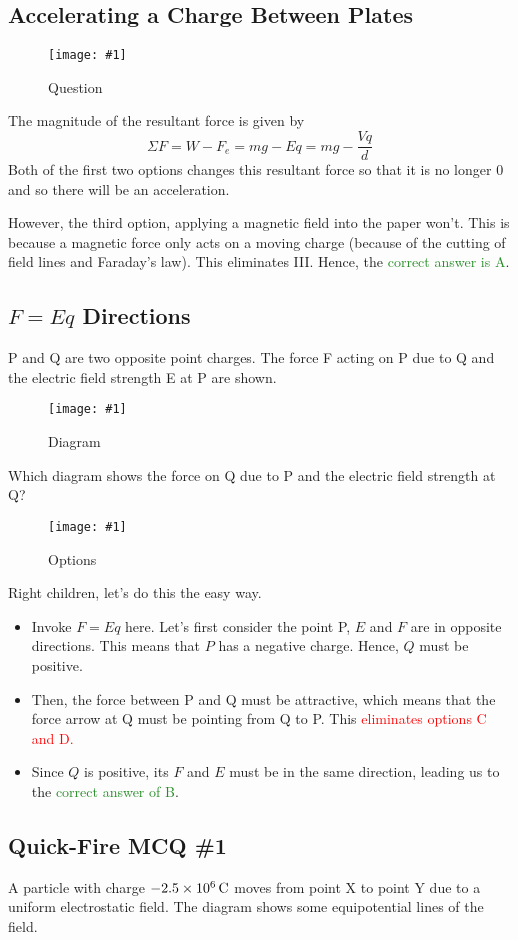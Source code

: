 \documentclass[a4paper,12pt]{article}
\newcommand{\img}[4]{\begin{center}
  \begin{figure}[H]
    \centering
    \texttt{[image: \#1]}
    \caption{#3}
    \label{fig:#4}
  \end{figure}
\end{center}}
\begin{document}
\pagebreak

\subsection{Accelerating a Charge Between Plates}

\img{ex/5.png}{0.9}{Question}{ex5}

The magnitude of the resultant force is given by
$$\Sigma F = W - F_e = mg - Eq = mg - \frac{Vq}{d}$$
Both of the first two options changes this resultant force so that it is no longer 0 and so there will be an acceleration.

However, the third option, applying a magnetic field into the paper won't. This is because a magnetic force only acts on a moving charge (because of the cutting of field lines and Faraday's law). This eliminates III. Hence, the \textcolor{ForestGreen}{correct answer is A}.

\pagebreak

\subsection{\texorpdfstring{$F = Eq$}{F = Eq} Directions}

P and Q are two opposite point charges. The force F acting on P due to Q and the electric field strength E at P are shown.

\img{ex/6.png}{0.3}{Diagram}{ex6}

Which diagram shows the force on Q due to P and the electric field strength at Q?

\img{ex/7.png}{0.4}{Options}{ex7}

Right children, let's do this the easy way. \begin{itemize}
  \item Invoke $F = Eq$ here. Let's first consider the point P, $E$ and $F$ are in opposite directions. This means that $P$ has a negative charge. Hence, $Q$ must be positive.
  \item Then, the force between P and Q must be attractive, which means that the force arrow at Q must be pointing from Q to P. This \textcolor{red}{eliminates options C and D.}
  \item Since $Q$ is positive, its $F$ and $E$ must be in the same direction, leading us to the \textcolor{ForestGreen}{correct answer of B}.
\end{itemize}

\pagebreak

\subsection{Quick-Fire MCQ \#1}
A particle with charge $-\SI{2.5e6}{\C}$ moves from point X to point Y due to a uniform electrostatic field. The diagram shows some equipotential lines of the field.
\end{document}
